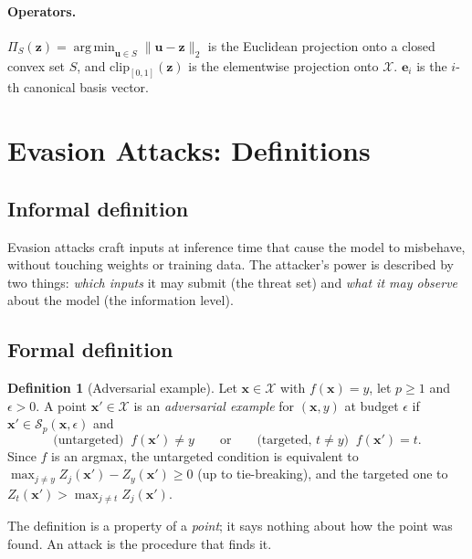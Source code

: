 \documentclass[10pt,a4paper]{extarticle}
\theoremstyle{definition}
\newtheorem{definition}{Definition}[section]
\newcommand{\X}{\mathcal{X}}
\newcommand{\x}{\mathbf{x}}
\newcommand{\xadv}{\mathbf{x}'}
\newcommand{\Proj}{\Pi}
\DeclareMathOperator*{\argmin}{arg\,min}
\begin{document}
\paragraph{Operators.} \(\Proj_S(\mathbf{z})=\argmin_{\mathbf{u}\in S}\|\mathbf{u}-\mathbf{z}\|_2\) is the Euclidean projection onto a closed convex set \(S\), and \(\mathrm{clip}_{[0,1]}(\mathbf{z})\) is the elementwise projection onto \(\X\). \(\mathbf{e}_i\) is the \(i\)-th canonical basis vector.

\section{Evasion Attacks: Definitions}\label{sec:defs}

\subsection{Informal definition}

Evasion attacks craft inputs at inference time that cause the model to misbehave, without touching weights or training data. The attacker's power is described by two things: \emph{which inputs} it may submit (the threat set) and \emph{what it may observe} about the model (the information level).

\subsection{Formal definition}

\begin{definition}[Adversarial example]\label{def:adv}
Let \(\x\in\X\) with \(f(\x)=y\), let \(p\ge1\) and \(\epsilon>0\). A point \(\xadv\in\X\) is an \emph{adversarial example} for \((\x,y)\) at budget \(\epsilon\) if \(\xadv\in\mathcal{S}_p(\x,\epsilon)\) and
\[
\text{(untargeted)}\;\; f(\xadv)\neq y
\qquad\text{or}\qquad
\text{(targeted, } t\neq y\text{)}\;\; f(\xadv)=t .
\]
Since \(f\) is an argmax, the untargeted condition is equivalent to \(\max_{j\neq y}Z_j(\xadv)-Z_y(\xadv)\ge 0\) (up to tie-breaking), and the targeted one to \(Z_t(\xadv)>\max_{j\neq t}Z_j(\xadv)\).
\end{definition}

The definition is a property of a \emph{point}; it says nothing about how the point was found. An attack is the procedure that finds it.
\end{document}
